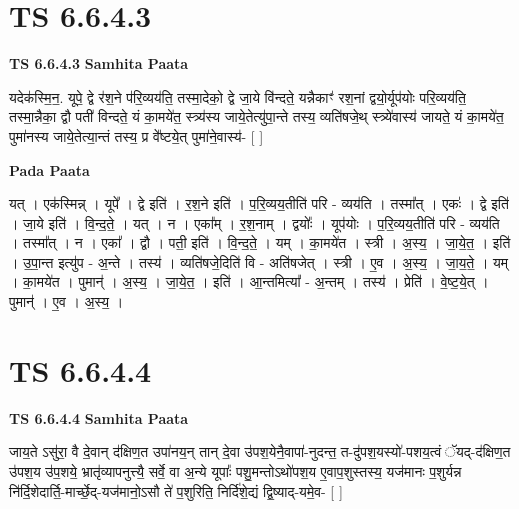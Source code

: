 \documentclass[17pt]{extarticle}
\begin{document}
\section*{ TS 6.6.4.3 }

\textbf{TS 6.6.4.3 } \newline
\textbf{Samhita Paata} \newline

यदेक॑स्मि॒न॒. यूपे॒ द्वे र॑श॒ने प॑रि॒व्यय॑ति॒ तस्मा॒देको॒ द्वे जा॒ये वि॑न्दते॒ यन्नैकाꣳ॑ रश॒नां द्वयो॒र्यूप॑योः परि॒व्यय॑ति॒ तस्मा॒न्नैका॒ द्वौ पती॑ विन्दते॒ यं का॒मये॑त॒ स्त्र्य॑स्य जाये॒तेत्यु॑पा॒न्ते तस्य॒ व्यति॑षजे॒थ् स्त्र्ये॑वास्य॑ जायते॒ यं का॒मये॑त॒ पुमा॑नस्य जाये॒तेत्या॒न्तं तस्य॒ प्र वे᳚ष्टये॒त् पुमा॑ने॒वास्य॑- [  ] \newline

\textbf{Pada Paata} \newline

यत् । एक॑स्मिन्न् । यूपे᳚ । द्वे इति॑ । र॒श॒ने इति॑ । प॒रि॒व्यय॒तीति॑ परि - व्यय॑ति । तस्मा᳚त् । एकः॑ । द्वे इति॑ । जा॒ये इति॑ । वि॒न्द॒ते॒ । यत् । न । एका᳚म् । र॒श॒नाम् । द्वयोः᳚ । यूप॑योः । प॒रि॒व्यय॒तीति॑ परि - व्यय॑ति । तस्मा᳚त् । न । एका᳚ । द्वौ । पती॒ इति॑ । वि॒न्द॒ते॒ । यम् । का॒मये॑त । स्त्री । अ॒स्य॒ । जा॒ये॒त॒ । इति॑ । उ॒पा॒न्त इत्यु॑प - अ॒न्ते । तस्य॑ । व्यति॑षजे॒दिति॑ वि - अति॑षजेत् । स्त्री । ए॒व । अ॒स्य॒ । जा॒य॒ते॒ । यम् । का॒मये॑त । पुमान्॑ । अ॒स्य॒ । जा॒ये॒त॒ । इति॑ । आ॒न्तमित्या᳚ - अ॒न्तम् । तस्य॑ । प्रेति॑ । वे॒ष्ट॒ये॒त् । पुमान्॑ । ए॒व । अ॒स्य॒ ।  \newline




\section*{ TS 6.6.4.4 }

\textbf{TS 6.6.4.4 } \newline
\textbf{Samhita Paata} \newline

जाय॒ते ऽसु॑रा॒ वै दे॒वान् द॑क्षिण॒त उपा॑नय॒न् तान् दे॒वा उ॑पश॒येनै॒वापा॑-नुदन्त॒ त-दु॑पश॒यस्यो॑-पशय॒त्वं ॅयद्-द॑क्षिण॒त उ॑पश॒य उ॑प॒शये॒ भ्रातृ॑व्यापनुत्त्यै॒ सर्वे॒ वा अ॒न्ये यूपाः᳚ पशु॒मन्तोऽथो॑पश॒य ए॒वाप॒शुस्तस्य॒ यज॑मानः प॒शुर्यन्न नि॑र्दि॒शेदार्ति॒-मार्च्छे॒द्-यज॑मानो॒ऽसौ ते॑ प॒शुरिति॒ निर्दि॑शे॒द्यं द्वि॒ष्याद्-यमे॒व- [  ] \newline
\end{document}
